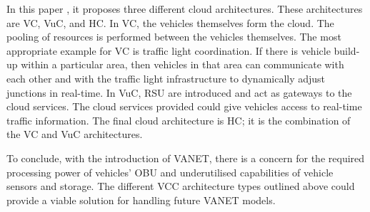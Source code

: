In this paper \citep{Hussain2012RethinkingComputing}, it proposes three different cloud architectures. These architectures are \ac{VC}, \ac{VuC}, and \ac{HC}. In \ac{VC}, the vehicles themselves form the cloud. The pooling of resources is performed between the vehicles themselves. The most appropriate example for \ac{VC} is traffic light coordination. If there is vehicle build-up within a particular area, then vehicles in that area can communicate with each other and with the traffic light infrastructure to dynamically adjust junctions in real-time. In \ac{VuC}, \ac{RSU} are introduced and act as gateways to the cloud services. The cloud services provided could give vehicles access to real-time traffic information. The final cloud architecture is \ac{HC}; it is the combination of the \ac{VC} and \ac{VuC} architectures.

To conclude, with the introduction of \ac{VANET}, there is a concern for the required processing power of vehicles' \ac{OBU} and underutilised capabilities of vehicle sensors and storage. The different \ac{VCC} architecture types outlined above could provide a viable solution for handling future \ac{VANET} models.